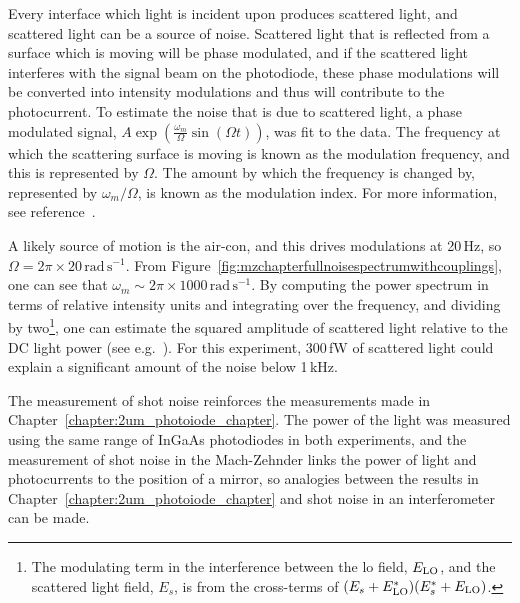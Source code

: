 Every interface which light is incident upon produces scattered light, and scattered light can be a source of noise. Scattered light that is reflected from a surface which is moving will be phase modulated, and if the scattered light interferes with the signal beam on the photodiode, these phase modulations will be converted into intensity modulations and thus will contribute to the photocurrent. To estimate the noise that is due to scattered light, a phase modulated signal, $A\exp\left(\frac{\omega_m}{\Omega}\sin(\Omega t)\right)$, was fit to the data. The frequency at which the scattering surface is moving is known as the modulation frequency, and this is represented by $\Omega$. The amount by which the frequency is changed by, represented by $\omega_m/\Omega$, is known as the modulation index. For more information, see reference~\cite{Bond2016}.
\par
A likely source of motion is the air-con, and this drives modulations at 20\,Hz, so $\Omega = 2\pi\times20\,\si{\radian\,\second^{-1}}$. From Figure~\ref{fig:mzchapterfullnoisespectrumwithcouplings}, one can see that $\omega_m\sim\! 2\pi\times1000\,\si{\radian\,\second^{-1}}$. By computing the power spectrum in terms of relative intensity units and integrating over the frequency, and dividing by two\footnote{The modulating term in the interference between the \gls{lo} field, $E_{\rm{LO}}$, and the scattered light field, $E_s$, is from the cross-terms of $(E_s+E^*_{\rm{LO}})(E^*_s+E_{\rm{LO}})$.}, one can estimate the squared amplitude of scattered light relative to the DC light power (see e.g.~\cite{Chua2014}). For this experiment, 300\,fW of scattered light could explain a significant amount of the noise below 1\,kHz. 
\par
The measurement of shot noise reinforces the measurements made in Chapter~\ref{chapter:2um_photoiode_chapter}. The power of the light was measured using the same range of InGaAs photodiodes in both experiments, and the measurement of shot noise in the Mach-Zehnder links the power of light and photocurrents to the position of a mirror, so analogies between the results in Chapter~\ref{chapter:2um_photoiode_chapter} and shot noise in an interferometer can be made.
